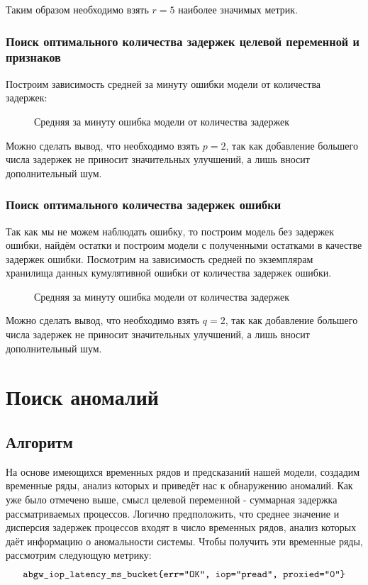 \documentclass[14pt, a4paper]{extarticle}
\begin{document}
Таким образом необходимо взять $r=5$ наиболее значимых метрик.

\subsubsection{Поиск оптимального количества задержек целевой переменной и признаков}	
Построим зависимость средней за минуту ошибки модели от количества задержек:
\begin{figure}[H]
		\centerline{} 
		\caption{Средняя за минуту ошибка модели от количества задержек}
		\label{target_metric_fig1}
	\end{figure} 	
Можно  сделать вывод, что необходимо взять $p = 2$, так как добавление большего числа задержек не приносит значительных улучшений, а лишь вносит дополнительный шум.

\subsubsection{Поиск оптимального количества задержек ошибки}	
Так как мы не можем наблюдать ошибку, то построим модель без  задержек ошибки, найдём остатки и построим модели с полученными  остатками в качестве задержек ошибки. Посмотрим на зависимость средней по экземплярам хранилища данных кумулятивной ошибки от количества задержек ошибки. 
\begin{figure}[H]
		\centerline{} 
		\caption{Средняя за минуту ошибка модели от количества задержек}
		\label{target_metric_fig1}
\end{figure} 	
Можно  сделать вывод, что необходимо взять $q = 2$, так как добавление большего числа задержек не приносит значительных улучшений, а лишь вносит дополнительный шум.
	
	\section{Поиск аномалий}	
	\subsection{ Алгоритм}	
	На основе имеющихся временных рядов и предсказаний нашей модели, создадим временные ряды, анализ которых и приведёт нас к обнаружению аномалий. Как уже было отмечено выше, смысл целевой переменной - суммарная задержка рассматриваемых процессов. Логично предположить, что среднее значение и дисперсия задержек процессов входят в число временных рядов, анализ которых даёт информацию о аномальности системы. Чтобы получить эти временные ряды, рассмотрим следующую метрику:\\ 
	$$\texttt{abgw\_iop\_latency\_ms\_bucket\{err="OK"\\, iop="pread"\\, proxied="0"\}}$$
	
\end{document}
